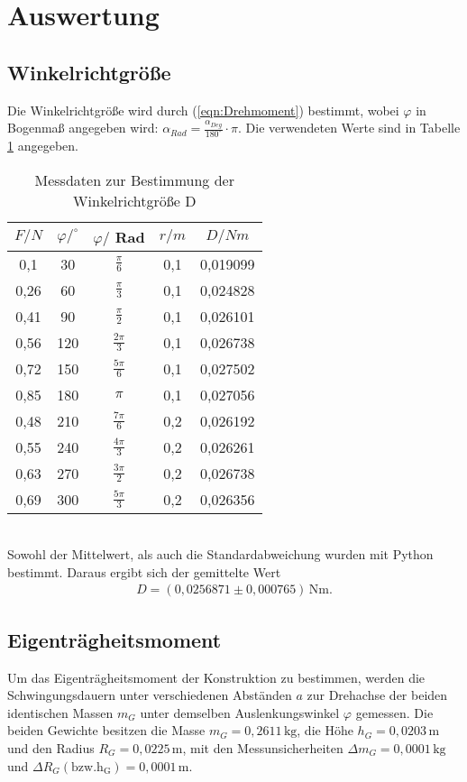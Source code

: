 \section{Auswertung}
\label{sec:Auswertung}

\subsection{Winkelrichtgröße}
\label{sec:Winkelrichtgroeße}
Die Winkelrichtgröße wird durch (\ref{eqn:Drehmoment})
bestimmt, wobei $\varphi$ in Bogenmaß angegeben wird: $\alpha_{Rad} = \frac{\alpha_{Deg}}{180^{\circ}}\cdot \pi $. 
Die verwendeten Werte sind in Tabelle \ref{tab:winkelrichtgr} angegeben.
\begin{table}
  \centering
  \caption{Messdaten zur Bestimmung der Winkelrichtgröße D}
  \label{tab:winkelrichtgr}
  \begin{tabular}{c c c c c}
    \toprule
    $F/N$ & $\varphi /^{\circ}$ & $\varphi /$ Rad & $r/m$ & $D/Nm$ \\
    \midrule
    0,1  &  30 & $\frac{\pi}{6}$ & 0,1 & 0,019099 \\
    0,26 &  60 & $\frac{\pi}{3}$ & 0,1 & 0,024828 \\
    0,41 &  90 & $\frac{\pi}{2}$ & 0,1 & 0,026101 \\
    0,56 & 120 & $\frac{2\pi}{3}$ & 0,1 & 0,026738 \\
    0,72 & 150 & $\frac{5\pi}{6}$ & 0,1 & 0,027502 \\
    0,85 & 180 & $\pi$ & 0,1 & 0,027056 \\
    0,48 & 210 & $\frac{7\pi}{6}$ & 0,2 & 0,026192 \\
    0,55 & 240 & $\frac{4\pi}{3}$ & 0,2 & 0,026261 \\
    0,63 & 270 & $\frac{3\pi}{2}$ & 0,2 & 0,026738 \\
    0,69 & 300 & $\frac{5\pi}{3}$ & 0,2 & 0,026356 \\
    \bottomrule
  \end{tabular}
\end{table}
\\Sowohl der Mittelwert, als auch die Standardabweichung wurden mit Python bestimmt. Daraus ergibt sich der
gemittelte Wert
\begin{align*}
    D = (0{,}0256871 \pm 0{,}000765)\,\mathrm{Nm} .
\end{align*}

\subsection{Eigenträgheitsmoment}
\label{sec:Eigentraegheitsmoment}
Um das Eigenträgheitsmoment der Konstruktion zu bestimmen, werden die Schwingungsdauern unter verschiedenen Abständen $a$ zur Drehachse
der beiden identischen Massen $m_G$ unter demselben Auslenkungswinkel $\varphi$ gemessen.
Die beiden Gewichte besitzen die Masse $m_G = 0,2611\, \mathrm{kg}$, die Höhe $h_G = 0,0203\, \mathrm{m}$ und den Radius $R_G = 0,0225\, \mathrm{m}$, mit
den Messunsicherheiten $\Delta m_G = 0,0001\, \mathrm{kg}$ und $\Delta R_G\mathrm{(bzw. h_G)} = 0,0001\, \mathrm{m}$.

